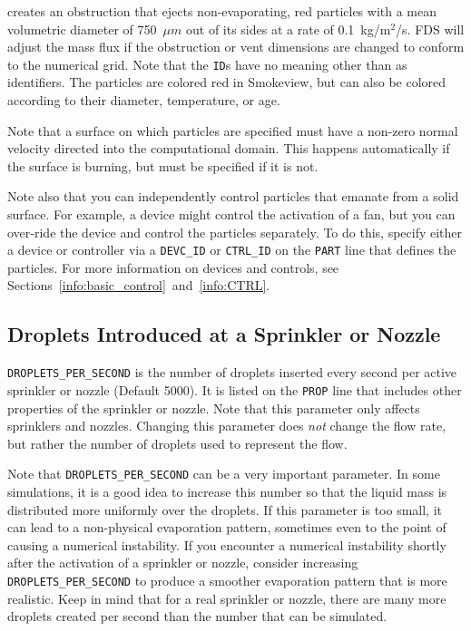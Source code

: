 \documentclass[11pt]{book}
\newcommand{\ct}{\tt\small}
\begin{document}
\noindent
creates an obstruction that ejects non-evaporating, red particles with a mean volumetric diameter of 750~$\mu m$ out of its sides at a rate
of 0.1~kg/m$^2$/s. FDS will adjust the mass flux if the obstruction or vent dimensions are changed to conform to the numerical grid. Note that the
{\ct ID}s have no meaning other than as identifiers. The particles are colored red in Smokeview, but can also be colored according to their
diameter, temperature, or age.

Note that a surface on which particles are specified must have a non-zero normal velocity directed into the
computational domain. This happens automatically if the surface is burning, but must be specified
if it is not.

Note also that you can independently control particles that emanate from a solid surface. For example, a device might control the
activation of a fan, but you can over-ride the device and control the particles separately. To do this, specify either
a device or controller via a {\ct DEVC\_ID} or {\ct CTRL\_ID} on the {\ct PART} line that defines the particles. For more
information on devices and controls, see Sections~\ref{info:basic_control}~and~\ref{info:CTRL}.



\subsection{Droplets Introduced at a Sprinkler or Nozzle}

\label{info:sprinkler_droplets}

{\ct DROPLETS\_PER\_SECOND} is the  number of droplets inserted every
second per active sprinkler or nozzle (Default 5000). It is listed on the {\ct PROP} line that includes other properties of
the sprinkler or nozzle. Note that this parameter only affects sprinklers and nozzles.
Changing this parameter does {\em not} change the flow rate, but rather the number
of droplets used to represent the flow.

\begin{warning}
Note that {\ct DROPLETS\_PER\_SECOND} can be a very important parameter. In some simulations, it is a good idea to increase this number so that the
liquid mass is distributed more uniformly over the droplets. If this parameter is too small, it can lead to a non-physical evaporation pattern, sometimes even to the
point of causing a numerical instability. If you encounter a numerical instability shortly after the activation of a sprinkler or nozzle, consider increasing
{\ct DROPLETS\_PER\_SECOND} to produce a smoother evaporation pattern that is more realistic. Keep in mind that for a real sprinkler or nozzle, there are many more
droplets created per second than the number that can be simulated.
\end{warning}
\end{document}
